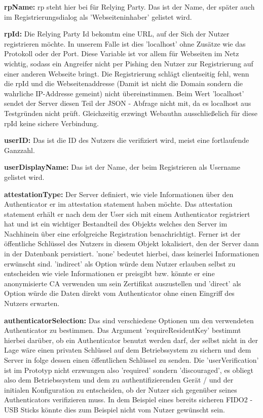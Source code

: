 \begin{enumerate}
\begin{itemize}
\textbf{rpName:} rp steht hier bei für Relying Party. Das ist der Name, der später auch im Registrierungsdialog als 'Webseiteninhaber' gelistet wird.

\textbf{rpId:} Die Relying Party Id bekomtm eine URL, auf der Sich der Nutzer registrieren möchte. In unserem Falle ist dies 'localhost' ohne Zusätze wie das Protokoll oder der Port. Diese Variable ist vor allem für Webseiten im Netz wichtig, sodass ein Angreifer nicht per Pishing den Nutzer zur Registrierung auf einer anderen Webseite bringt. Die Registrierung schlägt clientseitig fehl, wenn die rpId und die Webseitenaddresse (Damit ist nicht die Domain sondern die wahrliche IP-Addresse gemeint) nicht übereinstimmen. Beim Wert 'localhost' sendet der Server diesen Teil der JSON - Abfrage nicht mit, da es localhost aus Testgründen nicht prüft. Gleichzeitig erzwingt Webauthn ausschließelich für diese rpId keine sichere Verbindung.

\textbf{userID:} Das ist die ID des Nutzers die verifiziert wird, meist eine fortlaufende Ganzzahl.

\textbf{userDisplayName:} Das ist der Name, der beim Registrieren als Username gelistet wird.

\textbf{attestationType:} Der Server definiert, wie viele Informationen über den Authenticator er im attestation statement haben möchte. Das attestation statement erhält er nach dem der User sich mit einem Authenticator registriert hat und ist ein wichtiger Bestandteil des Objekts welches den Server im Nachhinein über eine erfolgreiche Registration benachrichtigt. Ferner ist der öffentliche Schlüssel des Nutzers in diesem Objekt lokalisiert, den der Server dann in der Datenbank persistiert. 'none' bedeutet hierbei, dass keinerlei Informationen erwünscht sind. 'indirect' als Option würde dem Nutzer erlauben selbst zu entscheiden wie viele Informationen er preisgibt bzw. könnte er eine anonymisierte CA verwenden um sein Zertifikat auszustellen und 'direct' als Option würde die Daten direkt vom Authenticator ohne einen Eingriff des Nutzers erwarten.

\textbf{authenticatorSelection:} Das sind verschiedene Optionen um den verwendeten Authenticator zu bestimmen. Das Argument 'requireResidentKey' bestimmt hierbei darüber, ob ein Authenticator benutzt werden darf, der selbst nicht in der Lage wäre einen privaten Schlüssel auf dem Betriebssystem zu sichern und dem Server in folge dessen einen öffentlichen Schlüssel zu senden. Die 'userVerification' ist im Prototyp nicht erzwungen also 'required' sondern 'discouraged', es obliegt also dem Betriebssystem und dem zu authentifizierenden Gerät / und der initialen Konfiguration zu entscheiden, ob der Nutzer sich gegenüber seines Authenticators verifizieren muss. In dem Beispiel eines bereits sicheren FIDO2 - USB Sticks könnte dies zum Beispiel nicht vom Nutzer gewünscht sein.


\end{itemize}
\end{enumerate}
